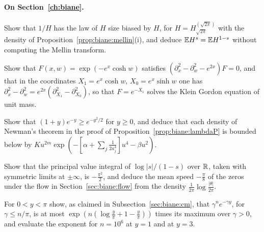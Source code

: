 \paragraph{On Section~\ref{ch:biane}.}
\begin{exercises}
\item Show that $1/H$ has the law of $H$ size biased by $H$, for $H=H^{(\sqrt{2\pi})}_{\sqrt{2\pi}}$ with the density of Proposition~\ref{prop:biane:mellin}(i), and deduce $\mathbb{E} H^s=\mathbb{E} H^{1-s}$ without computing the Mellin transform.
\item Show that $F(x,w)=\exp(-e^x\cosh w)$ satisfies $(\partial_x^2-\partial_w^2-e^{2x})F=0$, and that in the coordinates $X_1=e^x\cosh w$, $X_0=e^x\sinh w$ one has $\partial_x^2-\partial_w^2=e^{2x}(\partial_{X_1}^2-\partial_{X_0}^2)$, so that $F=e^{-X_1}$ solves the Klein Gordon equation of unit mass.
\item Show that $(1+y)e^{-y}\ge e^{-y^2/2}$ for $y\ge0$, and deduce that each density of Newman's theorem in the proof of Proposition~\ref{prop:biane:lambdaP} is bounded below by $Ku^{2m}\exp(-[\alpha+\sum_j\frac1{2a_j^4}]u^4-\beta u^2)$.
\item Show that the principal value integral of $\log|s|/(1-s)$ over $\mathbb{R}$, taken with symmetric limits at $\pm\infty$, is $-\frac{\pi^2}2$, and deduce the mean speed $-\frac\pi8$ of the zeros under the flow in Section~\ref{sec:biane:flow} from the density $\frac1{2\pi}\log\frac{|\theta|}{2\pi}$.
\item For $0<y<\pi$ show, as claimed in Subsection~\ref{sec:biane:cm}, that $\gamma^ne^{-\gamma y}$, for $\gamma\le n/\pi$, is at most $\exp(n(\log\frac y\pi+1-\frac y\pi))$ times its maximum over $\gamma>0$, and evaluate the exponent for $n=10^6$ at $y=1$ and at $y=3$.
\end{exercises}

